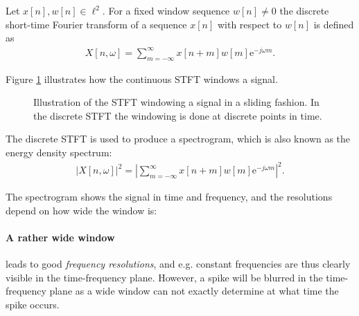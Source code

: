 \begin{definition}\label{def:stft_discrete}
Let $x[n],w[n]\in\ell^2$. For a fixed window sequence $w[n] \neq 0$ the discrete short-time Fourier transform of a sequence $x[n]$ with respect to $w[n]$ is defined as
\begin{align}
X[n, \omega] = \sum_{m=-\infty}^{\infty} x[n+m]w[m]\text{e}^{-j\omega m}.
\end{align}
\end{definition}

Figure \ref{fig:sliding_stft} illustrates how the continuous STFT windows a signal.

\begin{figure}[H]
\centering
{}
\caption{Illustration of the STFT windowing a signal in a sliding fashion. In the discrete STFT the windowing is done at discrete points in time.}
\label{fig:sliding_stft}
\end{figure}

The discrete STFT is used to produce a spectrogram, which is also known as the energy density spectrum:
\begin{align*}
|X[n,\omega]|^2 = \left| \sum_{m=-\infty}^{\infty} x[n+m]w[m]\text{e}^{-j\omega m} \right|^2.
\end{align*}

The spectrogram shows the signal in time and frequency, and the resolutions depend on how wide the window is:

\paragraph{A rather wide window} leads to good \textit{frequency resolutions}, and e.g. constant frequencies are thus clearly visible in the time-frequency plane. However, a spike will be blurred in the time-frequency plane as a wide window can not exactly determine at what time the spike occurs.
